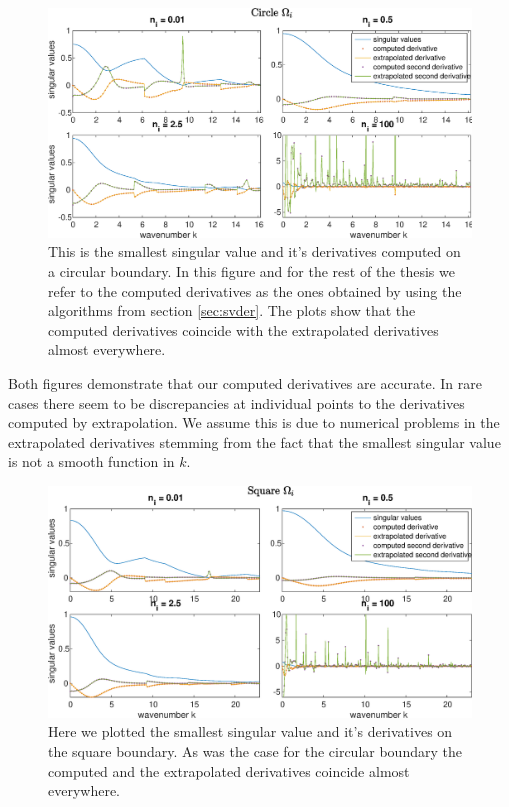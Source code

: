 \documentclass[a4paper, oneside]{thirdparty_stylesheets/discothesis}
\begin{document}
\begin{figure} [H]
	\centering
	\includegraphics[width=\columnwidth]{figures/derivatives_circle_refraction.eps}
	\caption{
		This is the smallest singular value and it's derivatives computed on a circular boundary.
		In this figure and for the rest of the thesis we refer to the computed derivatives as the ones obtained by using the algorithms from section \ref{sec:svder}.
		The plots show that the computed derivatives coincide with the extrapolated derivatives almost everywhere.
	}
	\label{fig:derivatives_circle_refraction}
\end{figure}
Both figures demonstrate that our computed derivatives are accurate.
In rare cases there seem to be discrepancies at individual points to the derivatives computed by extrapolation.
We assume this is due to numerical problems in the extrapolated derivatives stemming from the fact that the smallest singular value is not a smooth function in $k$.
\begin{figure} [H]
	\centering
	\includegraphics[width=\columnwidth]{figures/derivatives_square_refraction.eps}
	\caption{
		Here we plotted the smallest singular value and it's derivatives on the square boundary.
		As was the case for the circular boundary the computed and the extrapolated derivatives coincide almost everywhere.
	}
	\label{fig:derivatives_square_refraction}
\end{figure}
\end{document}
